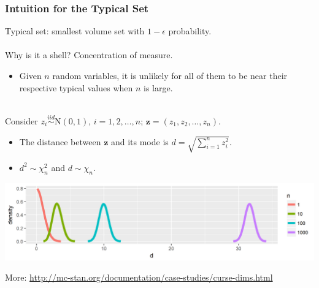 \documentclass[xcolor=dvipsnames]{beamer}
\begin{document}
\begin{frame}
\frametitle{Intuition for the Typical Set}
Typical set: smallest volume set with $1 - \epsilon$ probability.\\~\\

Why is it a shell? Concentration of measure.
\begin{itemize}
\item Given $n$ random variables, it is unlikely for all of them to be near their respective typical values when $n$ is large.\\~\\
\end{itemize}

Consider $z_i \stackrel{iid}{\sim} \mathrm{N}(0, 1)$, $i = 1,2,\dots, n$; $\bm{z} = (z_1,z_2,\dots,z_n)$.
\begin{itemize}
\item The distance between $\bm{z}$ and its mode is $d = \sqrt{\sum_{i=1}^nz_i^2}$.
\item $d^2\sim\chi^2_n$ and $d\sim\chi_n$.
\end{itemize}
\begin{center}
\includegraphics[width = \textwidth]{code/chiplot.png}
\end{center}
More: {\scriptsize \url{http://mc-stan.org/documentation/case-studies/curse-dims.html}}
\end{frame}
\end{document}
